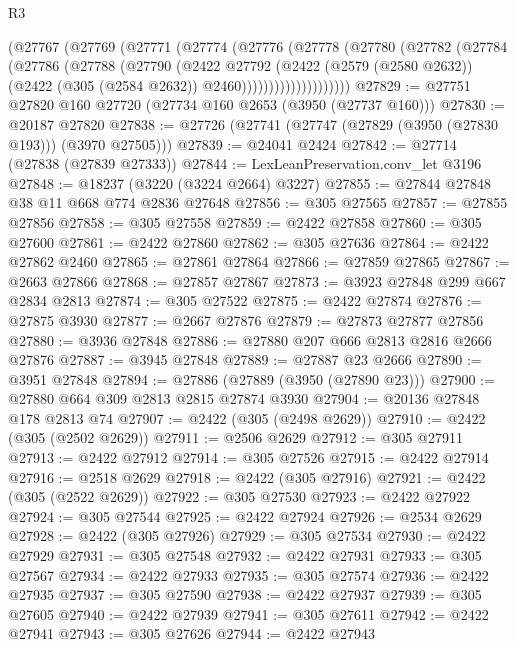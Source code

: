 \begin{lexlean}{R3}
\begin{coremodule}
              (@27767
                (@27769
                  (@27771
                    (@27774
                      (@27776
                        (@27778
                          (@27780
                            (@27782
                              (@27784
                                (@27786
                                  (@27788
                                    (@27790
                                      (@2422
                                        @27792
                                        (@2422
                                          (@2579 (@2580 @2632))
                                          (@2422 (@305 (@2584 @2632)) @2460))))))))))))))))))))
@27829 := @27751 @27820 @160 @27720 (@27734 @160 @2653 (@3950 (@27737 @160)))
@27830 := @20187 @27820
@27838 := @27726 (@27741 (@27747 (@27829 (@3950 (@27830 @193))) (@3970 @27505)))
@27839 := @24041 @2424
@27842 := @27714 (@27838 (@27839 @27333))
@27844 := LexLeanPreservation.conv_let @3196
@27848 := @18237 (@3220 (@3224 @2664) @3227)
@27855 := @27844 @27848 @38 @11 @668 @774 @2836 @27648
@27856 := @305 @27565
@27857 := @27855 @27856
@27858 := @305 @27558
@27859 := @2422 @27858
@27860 := @305 @27600
@27861 := @2422 @27860
@27862 := @305 @27636
@27864 := @2422 @27862 @2460
@27865 := @27861 @27864
@27866 := @27859 @27865
@27867 := @2663 @27866
@27868 := @27857 @27867
@27873 := @3923 @27848 @299 @667 @2834 @2813
@27874 := @305 @27522
@27875 := @2422 @27874
@27876 := @27875 @3930
@27877 := @2667 @27876
@27879 := @27873 @27877 @27856
@27880 := @3936 @27848
@27886 := @27880 @207 @666 @2813 @2816 @2666 @27876
@27887 := @3945 @27848
@27889 := @27887 @23 @2666
@27890 := @3951 @27848
@27894 := @27886 (@27889 (@3950 (@27890 @23)))
@27900 := @27880 @664 @309 @2813 @2815 @27874 @3930
@27904 := @20136 @27848 @178 @2813 @74
@27907 := @2422 (@305 (@2498 @2629))
@27910 := @2422 (@305 (@2502 @2629))
@27911 := @2506 @2629
@27912 := @305 @27911
@27913 := @2422 @27912
@27914 := @305 @27526
@27915 := @2422 @27914
@27916 := @2518 @2629
@27918 := @2422 (@305 @27916)
@27921 := @2422 (@305 (@2522 @2629))
@27922 := @305 @27530
@27923 := @2422 @27922
@27924 := @305 @27544
@27925 := @2422 @27924
@27926 := @2534 @2629
@27928 := @2422 (@305 @27926)
@27929 := @305 @27534
@27930 := @2422 @27929
@27931 := @305 @27548
@27932 := @2422 @27931
@27933 := @305 @27567
@27934 := @2422 @27933
@27935 := @305 @27574
@27936 := @2422 @27935
@27937 := @305 @27590
@27938 := @2422 @27937
@27939 := @305 @27605
@27940 := @2422 @27939
@27941 := @305 @27611
@27942 := @2422 @27941
@27943 := @305 @27626
@27944 := @2422 @27943

\end{coremodule}
\end{lexlean}
